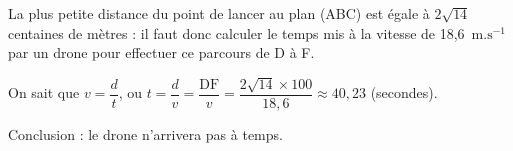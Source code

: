 \begin{enumerate}[resume]
La plus petite distance du point de lancer au plan (ABC) est égale à $2\sqrt{14}$ centaines de mètres : il faut donc calculer le temps mis à la vitesse de 18,6~$\text{m.s}^{-1}$ par un drone pour effectuer ce parcours de D à F.

On sait que $v = \dfrac{d}{t}$, ou $t = \dfrac{d}{v} = \dfrac{\text{DF}}{v} = \dfrac{2\sqrt{14} \times 100}{18,6} \approx 40,23$ (secondes).

Conclusion : le drone n'arrivera pas à temps.
\end{enumerate}

